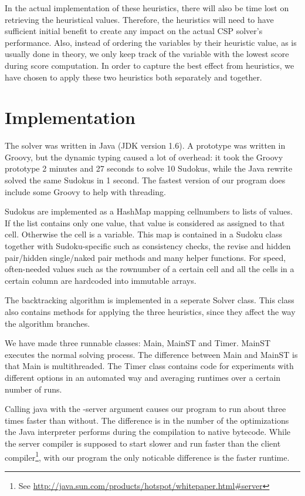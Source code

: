 \documentclass[11pt]{article} %
\begin{document}
In the actual implementation of these heuristics, there will also be time lost on retrieving the heuristical values. Therefore, the heuristics will need to have sufficient initial benefit to create any impact on the actual CSP solver's performance. Also, instead of ordering the variables by their heuristic value, as is usually done in theory, we only keep track of the variable with the lowest score during score computation. In order to capture the best effect from heuristics, we have chosen to apply these two heuristics both separately and together.

\section{Implementation}

The solver was written in Java (JDK version 1.6). A prototype was written in Groovy, but the dynamic typing caused a lot of overhead: it took the Groovy prototype 2 minutes and 27 seconds to solve 10 Sudokus, while the Java rewrite solved the same Sudokus in 1 second. The fastest version of our program does include some Groovy to help with threading.

Sudokus are implemented as a HashMap mapping cellnumbers to lists of values. If the list contains only one value, that value is considered as assigned to that cell. Otherwise the cell is a variable. This map is contained in a Sudoku class together with Sudoku-specific such as consistency checks, the revise and hidden pair/hidden single/naked pair methods and many helper functions. For speed, often-needed values such as the rownumber of a certain cell and all the cells in a certain column are hardcoded into immutable arrays.

The backtracking algorithm is implemented in a seperate Solver class. This class also contains methods for applying the three heuristics, since they affect the way the algorithm branches.

We have made three runnable classes: Main, MainST and Timer. MainST executes the normal solving process. The difference between Main and MainST is that Main is multithreaded. The Timer class contains code for experiments with different options in an automated way and averaging runtimes over a certain number of runs.

Calling java with the -server argument causes our program to run about three times faster than without. The difference is in the number of the optimizations the Java interpreter performs during the compilation to native bytecode. While the server compiler is supposed to start slower and run faster than the client compiler\footnote{See \url{http://java.sun.com/products/hotspot/whitepaper.html\#server}}, with our program the only noticable difference is the faster runtime.
\end{document}
